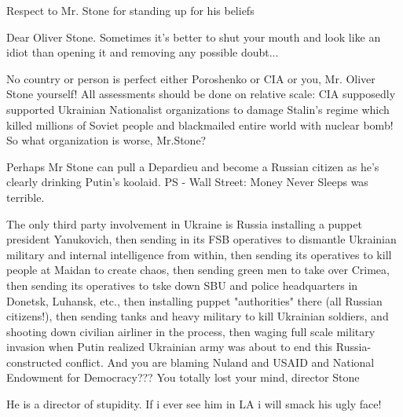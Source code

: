 \begin{itemize}

Respect to Mr. Stone for standing up for his beliefs


Dear Oliver Stone. Sometimes it's better to shut your mouth and look like an
idiot than opening it and removing any possible doubt...


No country or person is perfect either Poroshenko or CIA or you, Mr. Oliver
Stone yourself! All assessments should be done on relative scale: CIA
supposedly supported Ukrainian Nationalist organizations to damage Stalin's
regime which killed millions of Soviet people and blackmailed entire world with
nuclear bomb! So what organization is worse, Mr.Stone?


Perhaps Mr Stone can pull a Depardieu and become a Russian citizen as he's
clearly drinking Putin's koolaid. PS - Wall Street: Money Never Sleeps was
terrible.


The only third party involvement in Ukraine is Russia installing a puppet
president Yanukovich, then sending in its FSB operatives to dismantle Ukrainian
military and internal intelligence from within, then sending its operatives to
kill people at Maidan to create chaos, then sending green men to take over
Crimea, then sending its operatives to tske down SBU and police headquarters in
Donetsk, Luhansk, etc., then installing puppet "authorities" there (all Russian
citizens!), then sending tanks and heavy military to kill Ukrainian soldiers,
and shooting down civilian airliner in the process, then waging full scale
military invasion when Putin realized Ukrainian army was about to end this
Russia-constructed conflict. And you are blaming Nuland and USAID and National
Endowment for Democracy??? You totally lost your mind, director Stone

\begin{itemize} %
He is a director of stupidity. If i ever see him in LA i will smack his ugly face!
\end{itemize} %

\end{itemize} %
